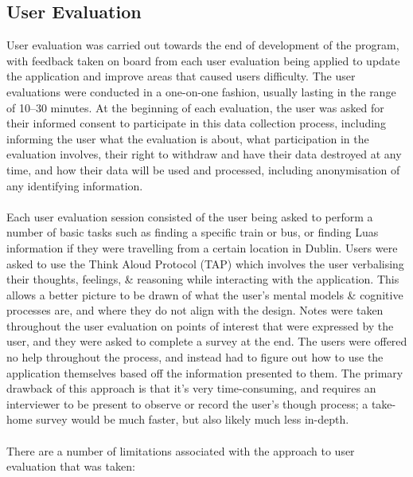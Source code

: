 \documentclass[a4paper,11pt]{report}
\begin{document}
\subsection{User Evaluation}
User evaluation was carried out towards the end of development of the program, with feedback taken on board from each user evaluation being applied to update the application and improve areas that caused users difficulty.
The user evaluations were conducted in a one-on-one fashion, usually lasting in the range of 10--30 minutes.
At the beginning of each evaluation, the user was asked for their informed consent to participate in this data collection process, including informing the user what the evaluation is about, what participation in the evaluation involves, their right to withdraw and have their data destroyed at any time, and how their data will be used and processed, including anonymisation of any identifying information.
\\\\
Each user evaluation session consisted of the user being asked to perform a number of basic tasks such as finding a specific train or bus, or finding Luas information if they were travelling from a certain location in Dublin.
Users were asked to use the Think Aloud Protocol (TAP)\supercite{tap} which involves the user verbalising their thoughts, feelings, \& reasoning while interacting with the application.
This allows a better picture to be drawn of what the user's mental models \& cognitive processes are, and where they do not align with the design.
Notes were taken throughout the user evaluation on points of interest that were expressed by the user, and they were asked to complete a survey at the end.
The users were offered no help throughout the process, and instead had to figure out how to use the application themselves based off the information presented to  them.
The primary drawback of this approach is that it's very time-consuming, and requires an interviewer to be present to observe or record the user's though process;
a take-home survey would be much faster, but also likely much less in-depth.
\\\\
There are a number of limitations associated with the approach to user evaluation that was taken:
\end{document}
